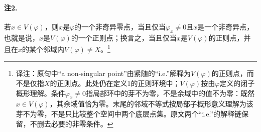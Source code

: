 \documentclass[openany,fontset=fandol]{ctexbook}
\newcommand{\note}[1]{\unskip\nobreak\footnote{译注：#1}}
\begin{document}
\paragraph{注2.}
若$x\in V(\varphi)$，则$x$是$\varphi$的一个非奇异零点，当且仅当$\varphi_x\ne0$且$x$是一个非奇异点，也就是说，$x$是$V(\varphi)$的一个正则点；换言之，当且仅当$x$是$V(\varphi)$的正则点，并且在$x$的某个邻域内$V(\varphi)\ne X$。\note{原句中“a non-singular point”由紧随的“i.e.”解释为$V(\varphi)$的正则点，而不是仅指$X$的正则点。此处仍在定义1的正则环境中；$V(\varphi)$按由$\varphi$定义的闭子概形理解。条件$\varphi_x\ne0$指局部环中的芽不为零，不是余域中的值不为零：既然$x\in V(\varphi)$，其余域值恰为零。末尾的邻域不等式按局部子概形意义理解为该芽不为零，不是只比较整个空间中两个底层点集。原文两个“i.e.”的解释链保留，不删去必要的非零条件。}
\end{document}
